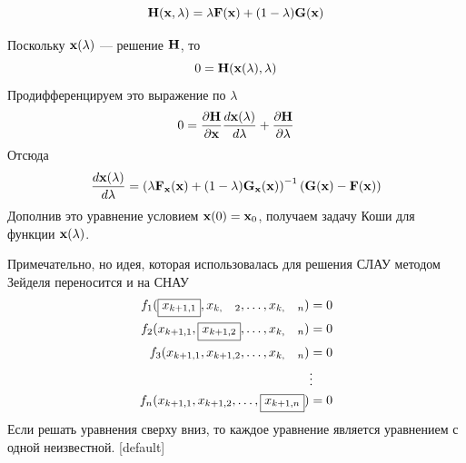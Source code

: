 \documentclass[professionalfonts,compress,unicode]{beamer}
\begin{document}
{
	$$
	{\bf H}({\bf x}, \lambda) = \lambda {\bf F}({\bf x}) + (1-\lambda) {\bf G}({\bf x})
	$$
	
	Поскольку ${\bf x}(\lambda)$ --- решение ${\bf H}$, то
	$$
	0 = {\bf H}({\bf x}(\lambda), \lambda)
	$$
	Продифференцируем это выражение по $\lambda$
	$$
	0 = \frac{\partial {\bf H}}{\partial {\bf x}} \frac{d {\bf x}(\lambda)}{d \lambda} + \frac{\partial {\bf H}}{\partial \lambda}
	$$
	Отсюда
	$$
	\frac{d {\bf x}(\lambda)}{d \lambda} = \left(\lambda {\bf F}_{\bf x}({\bf x}) + (1-\lambda) {\bf G}_{\bf x}({\bf x})\right)^{-1} ({\bf G}({\bf x}) - {\bf F}({\bf x}))
	$$
	Дополнив это уравнение условием ${\bf x}(0) = {\bf x}_0$, получаем задачу Коши для функции ${\bf x}(\lambda)$.
}

{
	Примечательно, но идея, которая использовалась для решения СЛАУ методом Зейделя переносится и на СНАУ
	\begin{align*}
	f_1(\fbox{$x_{k+1,1}$}, x_{k,\phantom{+1}2},\dots,x_{k,\phantom{+1}n}) &=0\\
	f_2(x_{k+1,1},\fbox{$x_{k+1,2}$}, \dots, x_{k,\phantom{+1}n}) &=0\\
	f_3(x_{k+1,1}, x_{k+1,2}, \dots, x_{k,\phantom{+1}n}) &=0\\
	&\vdots\\
	f_n(x_{k+1,1},x_{k+1,2},\dots,\fbox{$x_{k+1,n}$}) &= 0
	\end{align*}
	Если решать уравнения сверху вниз, то каждое уравнение является уравнением с одной неизвестной.
}
{
[default] 
}
\end{document}
